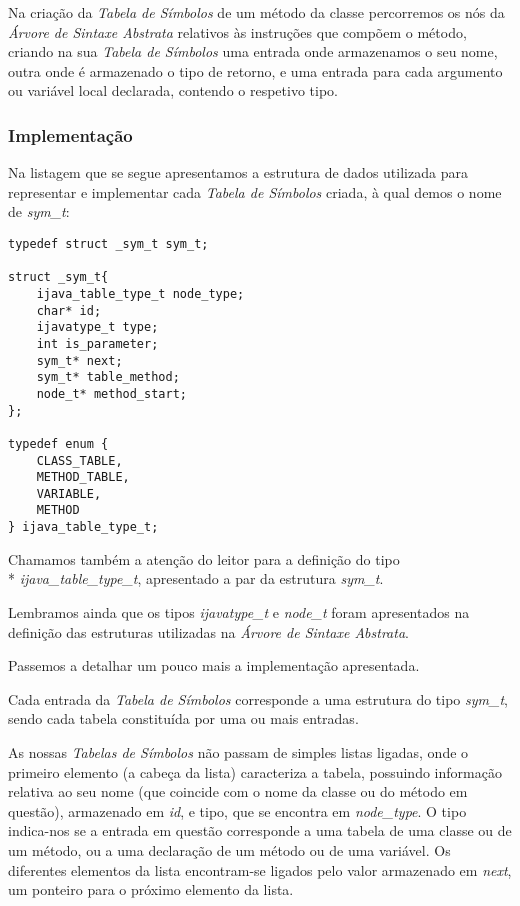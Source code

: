 \documentclass[11pt,a4paper]{article}
\begin{document}
	Na criação da \emph{Tabela de Símbolos} de um método da classe percorremos os nós da \emph{Árvore de Sintaxe Abstrata} relativos às instruções que compõem o método, criando na sua \emph{Tabela de Símbolos} uma entrada onde armazenamos o seu nome, outra onde é armazenado o tipo de retorno, e uma entrada para cada argumento ou variável local declarada, contendo o respetivo tipo.
	
	\subsubsection{Implementação}
	
	Na listagem que se segue apresentamos a estrutura de dados utilizada para representar e implementar cada \emph{Tabela de Símbolos} criada, à qual demos o nome de \emph{sym\_t}:
	
	\begin{lstlisting}
typedef struct _sym_t sym_t;	

struct _sym_t{
	ijava_table_type_t node_type;
	char* id;
	ijavatype_t type;
	int is_parameter;
	sym_t* next;
	sym_t* table_method;
	node_t* method_start;
};

typedef enum {
	CLASS_TABLE,
	METHOD_TABLE,
	VARIABLE,
	METHOD
} ijava_table_type_t;
	\end{lstlisting}
	
	Chamamos também a atenção do leitor para a definição do tipo \\* \emph{ijava\_table\_type\_t}, apresentado a par da estrutura \emph{sym\_t}.
	
	Lembramos ainda que os tipos \emph{ijavatype\_t} e \emph{node\_t} foram apresentados na definição das estruturas utilizadas na \emph{Árvore de Sintaxe Abstrata}.
	
	Passemos a detalhar um pouco mais a implementação apresentada.
	
	Cada entrada da \emph{Tabela de Símbolos} corresponde a uma estrutura do tipo \emph{sym\_t}, sendo cada tabela constituída por uma ou mais entradas.
	
	As nossas \emph{Tabelas de Símbolos} não passam de simples listas ligadas, onde o primeiro elemento (a cabeça da lista) caracteriza a tabela, possuindo informação relativa ao seu nome (que coincide com o nome da classe ou do método em questão), armazenado em \emph{id}, e tipo, que se encontra em \emph{node\_type}. O tipo indica-nos se a entrada em questão corresponde a uma tabela de uma classe ou de um método, ou a uma declaração de um método ou de uma variável. Os diferentes elementos da lista encontram-se ligados pelo valor armazenado em \emph{next}, um ponteiro para o próximo elemento da lista.
	
\end{document}
